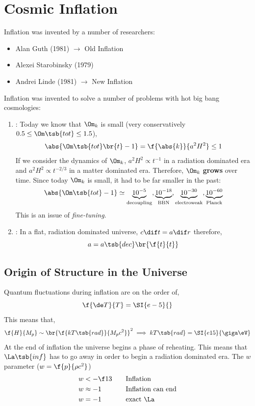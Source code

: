 \documentclass{article}
\begin{document}
\section{Cosmic Inflation}

Inflation was invented by a number of researchers:
\begin{itemize}
    \item Alan Guth (1981) $\to$ Old Inflation
    \item Alexei Starobinsky (1979)
    \item Andrei Linde (1981) $\to$ New Inflation
\end{itemize}

Inflation was invented to solve a number of problems with hot big bang cosmologies:
\begin{enumerate}
    \item {}: Today we know that $\Om_k$ is small (very conservatively $0.5 \leq \Om\tsb{tot} \leq 1.5$),
    \[ \abs{\Om\tsb{tot}\br{t} - 1} = \f{\abs{k}}{a^2 H^2} \leq 1 \]
    If we consider the dynamics of $\Om_k$, $a^2 H^2 \propto t^{-1}$ in a radiation dominated era and $a^2 H^2 \propto t^{-2/3}$ in a matter dominated era. Therefore, $\Om_k$ \textbf{grows} over time. Since today $\Om_k$ is small, it had to be far smaller in the past:
    \[ \abs{\Om\tsb{tot} - 1} \simeq \underbrace{10^{-5}}_{\text{decoupling}}, \underbrace{10^{-18}}_{\text{BBN}}, \underbrace{10^{-30}}_{\text{electroweak}}, \underbrace{10^{-60}}_{\text{Planck}} \]
    This is an issue of \textit{fine-tuning}.
    \item {}: In a flat, radiation dominated universe, $c \dif t = a \dif r$ therefore,
    \[ a = a\tsb{dec} \br{\f{t}{t}}^{} \]
\end{enumerate}

\subsection{Origin of Structure in the Universe}

Quantum fluctuations during inflation are on the order of,
\[  \f{\de T}{T} = \SI{e-5}{}\]
This means that,
\[ \f{H}{M_p} \sim \br{\f{k T\tsb{rad}}{M_p c^2}}^2 \implies k T\tsb{rad} = \SI{e15}{\giga\eV} \]
At the end of inflation the universe begins a phase of reheating. This means that $\La\tsb{inf}$ has to go away in order to begin a radiation dominated era. The $w$ parameter ($w = \f{p}{\rho c^2}$)
\begin{alignat*}{2}
    w &< -\f13 \quad &&\text{Inflation}\\
    w &\approx -1 \quad &&\text{Inflation can end}\\
    w &= -1 \quad &&\text{exact $\La$}
\end{alignat*}
\end{document}
